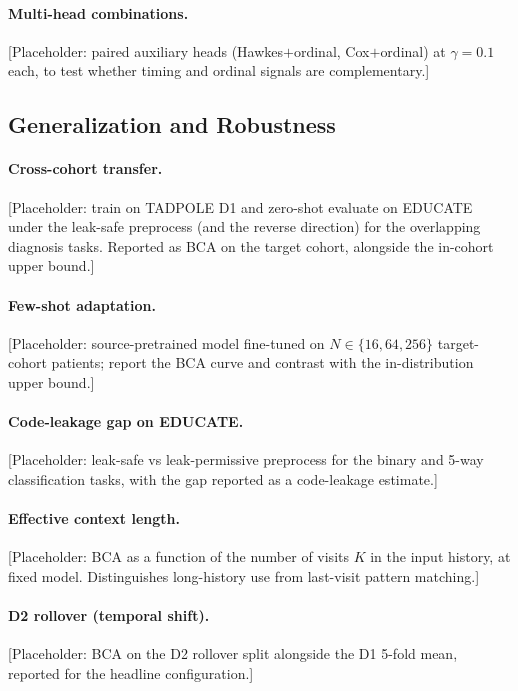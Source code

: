 \documentclass{article}
\begin{document}
\paragraph{Multi-head combinations.}
[Placeholder: paired auxiliary heads (Hawkes$+$ordinal, Cox$+$ordinal) at $\gamma=0.1$ each, to test whether timing and ordinal signals are complementary.]

\subsection{Generalization and Robustness}
\label{app:generalization}

\paragraph{Cross-cohort transfer.}
[Placeholder: train on TADPOLE D1 and zero-shot evaluate on EDUCATE under the leak-safe preprocess (and the reverse direction) for the overlapping diagnosis tasks. Reported as BCA on the target cohort, alongside the in-cohort upper bound.]

\paragraph{Few-shot adaptation.}
[Placeholder: source-pretrained model fine-tuned on $N \in \{16, 64, 256\}$ target-cohort patients; report the BCA curve and contrast with the in-distribution upper bound.]

\paragraph{Code-leakage gap on EDUCATE.}
[Placeholder: leak-safe vs leak-permissive preprocess for the binary and 5-way classification tasks, with the gap reported as a code-leakage estimate.]

\paragraph{Effective context length.}
[Placeholder: BCA as a function of the number of visits $K$ in the input history, at fixed model. Distinguishes long-history use from last-visit pattern matching.]

\paragraph{D2 rollover (temporal shift).}
[Placeholder: BCA on the D2 rollover split alongside the D1 5-fold mean, reported for the headline configuration.]
\end{document}
